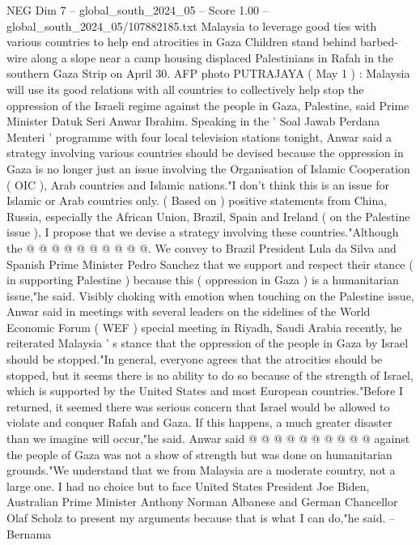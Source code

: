 \begin{textsample}{NEG Dim 7 – global\_south\_2024\_05 – Score 1.00 – global\_south\_2024\_05/107882185.txt}  \label{ex:f7_neg_247}
Malaysia to leverage good ties with various countries to help end atrocities in Gaza Children stand behind barbed-wire along a slope near a camp housing displaced Palestinians in Rafah in the southern Gaza Strip on April 30.
AFP photo PUTRAJAYA ( May 1 ) : Malaysia will use its good relations with all countries to collectively help stop the oppression of the Israeli regime against the people in Gaza, Palestine, said Prime Minister Datuk Seri Anwar Ibrahim.
Speaking in the ' Soal Jawab Perdana Menteri ' programme with four local television stations tonight, Anwar said a strategy involving various countries should be devised because the oppression in Gaza is no longer just an issue involving the Organisation of Islamic Cooperation ( OIC ), Arab countries and Islamic nations."I don't think this is an issue for Islamic or Arab countries only. ( Based on ) positive statements from China, Russia, especially the African Union, Brazil, Spain and Ireland ( on the Palestine issue ), I propose that we devise a strategy involving these countries."Although the @ @ @ @ @ @ @ @ @ @.
We convey to Brazil President Lula da Silva and Spanish Prime Minister Pedro Sanchez that we support and respect their stance ( in supporting Palestine ) because this ( oppression in Gaza ) is a humanitarian issue,"he said.
Visibly choking with emotion when touching on the Palestine issue, Anwar said in meetings with several leaders on the sidelines of the World Economic Forum ( WEF ) special meeting in Riyadh, Saudi Arabia recently, he reiterated Malaysia ' s stance that the oppression of the people in Gaza by Israel should be stopped."In general, everyone agrees that the atrocities should be stopped, but it seems there is no ability to do so because of the strength of Israel, which is supported by the United States and most European countries."Before I returned, it seemed there was serious concern that Israel would be allowed to violate and conquer Rafah and Gaza.
If this happens, a much greater disaster than we imagine will occur,"he said.
Anwar said @ @ @ @ @ @ @ @ @ @ against the people of Gaza was not a show of strength but was done on humanitarian grounds."We understand that we from Malaysia are a moderate country, not a large one.
I had no choice but to face United States President Joe Biden, Australian Prime Minister Anthony Norman Albanese and German Chancellor Olaf Scholz to present my arguments because that is what I can do,"he said. -- Bernama

\end{textsample}
